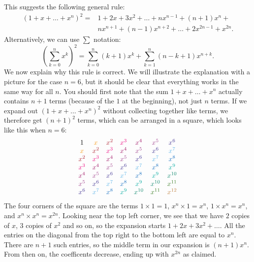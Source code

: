 \documentclass[a4paper]{book}
\newcommand{\BROWN}[1]{{\color{brown}#1}}
\newcommand{\OLIVEGREEN}[1]{{\color{olivegreen}#1}}
\newcommand{\YELLOWORANGE}[1]{{\color{YellowOrange}#1}}
\newcommand{\MAROON}[1]{{\color{Maroon}#1}}
\newcommand{\RUBINERED}[1]{{\color{RubineRed}#1}}
\newcommand{\REDVIOLET}[1]{{\color{RedViolet}#1}}
\newcommand{\DARKORCHID}[1]{{\color{DarkOrchid}#1}}
\newcommand{\BLUEVIOLET}[1]{{\color{BlueViolet}#1}}
\newcommand{\CORNFLOWERBLUE}[1]{{\color{CornflowerBlue}#1}}
\newcommand{\ROYALBLUE}[1]{{\color{RoyalBlue}#1}}
\newcommand{\EMERALD}[1]{{\color{Emerald}#1}}
\newcommand{\PINEGREEN}[1]{{\color{PineGreen}#1}}
\newcommand{\tm}        {\times}
\renewcommand{\:}{\colon}
\theoremstyle{definition}
\renewenvironment{solution}{\SolutionInline}{\endSolutionInline}
\begin{document}
\begin{solution}
 This suggests the following general rule:
 \begin{align*}
  (1 + x + \ldots + x^n)^2 = &
     1 + 2x + 3x^2 + \ldots + nx^{n-1} + (n+1)x^n + \\
 &    nx^{n+1} + (n-1)x^{n+2} + \ldots + 2x^{2n-1} + x^{2n}.
 \end{align*}
 Alternatively, we can use $\sum$ notation:
 \[ \left(\sum_{k=0}^n x^k\right)^2 =
     \sum_{k=0}^n (k+1)x^k +
     \sum_{k=1}^n (n-k+1)x^{n+k}.
 \]
 We now explain why this rule is correct.  We will illustrate the
 explanation with a picture for the case $n=6$, but it should be clear
 that everything works in the same way for all $n$.  You should first
 note that the sum $1+x+\ldots+x^n$ actually contains $n+1$ terms
 (because of the $1$ at the beginning), not just $n$ terms.  If we
 expand out $(1+x+\ldots+x^n)^2$ without collecting together like
 terms, we therefore get $(n+1)^2$ terms, which can be arranged in a
 square, which looks like this when $n=6$:
 \[ \begin{array}{ccccccc}
     1   &
     \YELLOWORANGE{x}   &
     \MAROON{x^2} &
     \RUBINERED{x^3} &
     \REDVIOLET{x^4}   &
     \DARKORCHID{x^5}   &
     \BLUEVIOLET{x^6} \\
     \YELLOWORANGE{x}   &
     \MAROON{x^2} &
     \RUBINERED{x^3} &
     \REDVIOLET{x^4} &
     \DARKORCHID{x^5}   &
     \BLUEVIOLET{x^6}   &
     \CORNFLOWERBLUE{x^7} \\
     \MAROON{x^2} &
     \RUBINERED{x^3} &
     \REDVIOLET{x^4} &
     \DARKORCHID{x^5} &
     \BLUEVIOLET{x^6}   &
     \CORNFLOWERBLUE{x^7}   &
     \ROYALBLUE{x^8} \\
     \RUBINERED{x^3} &
     \REDVIOLET{x^4} &
     \DARKORCHID{x^5} &
     \BLUEVIOLET{x^6} &
     \CORNFLOWERBLUE{x^7}   &
     \ROYALBLUE{x^8}   &
     \EMERALD{x^9} \\
     \REDVIOLET{x^4} &
     \DARKORCHID{x^5} &
     \BLUEVIOLET{x^6} &
     \CORNFLOWERBLUE{x^7} &
     \ROYALBLUE{x^8}   &
     \EMERALD{x^9}   &
     \PINEGREEN{x^{10}}  \\
     \DARKORCHID{x^5} &
     \BLUEVIOLET{x^6} &
     \CORNFLOWERBLUE{x^7} &
     \ROYALBLUE{x^8} &
     \EMERALD{x^9}   &
     \PINEGREEN{x^{10}}&
     \OLIVEGREEN{x^{11}} \\
     \BLUEVIOLET{x^6} &
     \CORNFLOWERBLUE{x^7} &
     \ROYALBLUE{x^8} &
     \EMERALD{x^9} &
     \PINEGREEN{x^{10}}&
     \OLIVEGREEN{x^{11}}&
     \BROWN{x^{12}}
 \end{array} \]
 The four corners of the square are the terms $1\tm 1=1$,
 $x^n\tm 1=x^n$, $1\tm x^n=x^n$, and $x^n\tm x^n=x^{2n}$.
 Looking near the top left corner, we see that we have $2$ copies of
 $x$, $3$ copies of $x^2$ and so on, so the expansion starts
 $1+2x+3x^2+\ldots$.  All the entries on the diagonal from the top
 right to the bottom left are equal to $x^n$.  There are $n+1$ such
 entries, so the middle term in our expansion is $(n+1)x^n$.  From
 then on, the coefficents decrease, ending up with $x^{2n}$ as
 claimed.
\end{solution}
\end{document}
